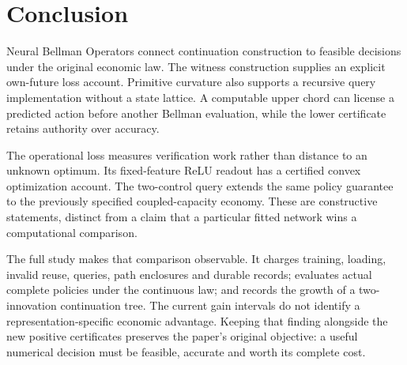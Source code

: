 \documentclass[ecta,nameyear,draft]{econsocart}
\begin{document}










\section{Conclusion}\label{sec:conclusion65}
Neural Bellman Operators connect continuation construction to feasible decisions under the original economic law. The witness construction supplies an explicit own-future loss account. Primitive curvature also supports a recursive query implementation without a state lattice. A computable upper chord can license a predicted action before another Bellman evaluation, while the lower certificate retains authority over accuracy.

The operational loss measures verification work rather than distance to an unknown optimum. Its fixed-feature ReLU readout has a certified convex optimization account. The two-control query extends the same policy guarantee to the previously specified coupled-capacity economy. These are constructive statements, distinct from a claim that a particular fitted network wins a computational comparison.

The full study makes that comparison observable. It charges training, loading, invalid reuse, queries, path enclosures and durable records; evaluates actual complete policies under the continuous law; and records the growth of a two-innovation continuation tree. The current gain intervals do not identify a representation-specific economic advantage. Keeping that finding alongside the new positive certificates preserves the paper's original objective: a useful numerical decision must be feasible, accurate and worth its complete cost.


\end{document}
